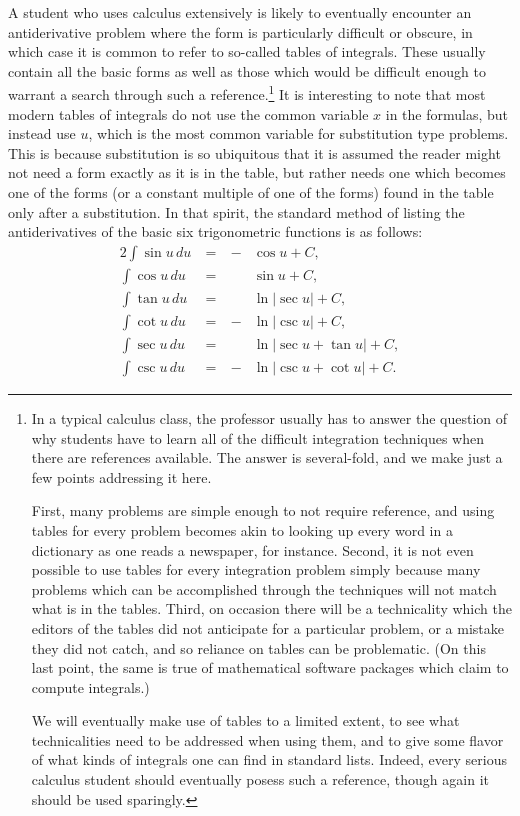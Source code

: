A student who uses calculus extensively is likely to eventually
encounter an antiderivative problem where the form is
particularly difficult or obscure, in which case it is common
to refer to so-called tables of integrals.  These usually
contain all the basic forms as well as those which would be
difficult enough to warrant a search through such a reference.\footnote{%
In a typical calculus class, the professor usually
has to answer the question of
why students have to learn all of the difficult integration techniques
when there are references available.  The answer is several-fold,
and we make just a few points addressing it here.

First, many problems are simple enough to not require reference,
and using tables for every problem becomes akin to looking up every word
in a dictionary as one reads a newspaper, for instance. 
Second, it is not even possible to use tables for 
every integration problem simply because 
many problems which can be accomplished through the techniques
will not match what is in the tables.  Third, on occasion there will
be a technicality which the editors of the tables did not anticipate
for a particular problem, or a mistake they did not catch,
and so reliance on tables can be problematic.
(On this last point, the same is true of mathematical software packages
which claim to compute integrals.)

We will eventually make use of tables to a limited extent, to see what
technicalities need to be addressed when using them, and to give some
flavor of what kinds of integrals one can find in standard lists.  Indeed,
every serious calculus student should eventually posess such a reference, 
though again it should be used sparingly.
}
It is interesting to note that most modern tables of integrals do
not use the common variable $x$ in the formulas, but instead use
$u$, which is the most common variable for substitution type problems.
This is because substitution is so ubiquitous that it is assumed
the reader might not need a form exactly as it is
in the table, but rather needs one which becomes one of the forms 
(or a constant multiple of one of the forms) found in the table
only after a substitution.  In that spirit, the standard method
of listing the antiderivatives of the basic six trigonometric
functions is as follows:
\begin{alignat}{2}
\int\sin u\,du&\ =\ &-&\cos u+C,\label{AntiDerivSinUdU}\\
\int\cos u\,du&\ =\ &&\sin u+C,\label{AntiDerivCosUdU}\\
\int\tan u\,du&\ =\ &&\ln|\sec u|+C,\label{AntiDerivTanUdU}\\
\int\cot u\,du&\ =\ &-&\ln|\csc u|+C,\label{AntiDerivCotUdU}\\
\int\sec u\,du&\ =\ &&\ln|\sec u+\tan u|+C,\label{AntiDerivSecUdU}\\
\int\csc u\,du&\ =\ &-&\ln|\csc u+\cot u|+C.\label{AntiDerivCscUdU}
\end{alignat}
